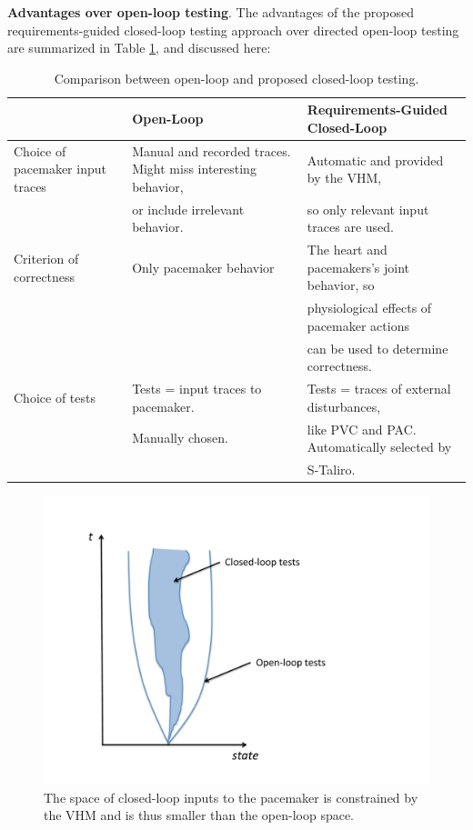 \textbf{Advantages over open-loop testing}.
The advantages of the proposed requirements-guided closed-loop testing approach over directed open-loop testing are summarized in Table \ref{table:CLoverOL}, and discussed here:
\begin{table}
	\centering
	\caption{Comparison between open-loop and proposed closed-loop testing.}
	\begin{tabular}{|l|l|l|}
	\hline                       & Open-Loop    & Requirements-Guided Closed-Loop 
	\\ 
	\hline Choice of pacemaker input traces  
	                & Manual and recorded traces. Might miss interesting behavior, &  Automatic and provided by the VHM,
	\\ 
					& or include irrelevant behavior. &  so only relevant input traces are used.
	\\
	\hline Criterion of correctness    & Only pacemaker behavior & The heart and pacemakers's joint behavior, so 
	\\
	                &                  & physiological effects of pacemaker actions
	\\
	                &                  &  can be used to determine correctness.                   
	\\ 
	\hline Choice of tests & Tests = input traces to pacemaker.  & Tests = traces of external disturbances, 
	\\
	                & Manually chosen.  & like PVC and PAC. Automatically selected by 
	\\
	                 &                   & S-Taliro.
	\\
	\hline 
\end{tabular}
\label{table:CLoverOL}
\end{table}

\begin{figure}[t]
\centering
\includegraphics[scale=0.3]{figures/cone}
\caption{The space of closed-loop inputs to the pacemaker is constrained by the VHM and is thus smaller than the open-loop space.}
\label{fig:cone}
\vspace{-.2cm}
\end{figure}

